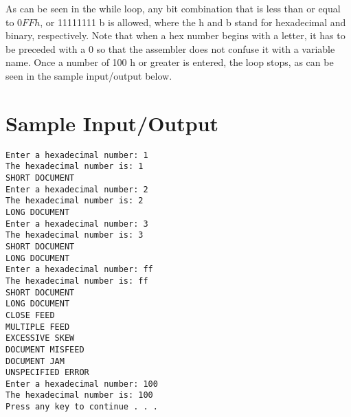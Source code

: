 \documentclass[10pt]{article}
\begin{document}
As can be seen in the while loop, any bit combination that is less than or equal to $0 F F h$, or 11111111 b is allowed, where the h and b stand for hexadecimal and binary, respectively. Note that when a hex number begins with a letter, it has to be preceded with a 0 so that the assembler does not confuse it with a variable name. Once a number of 100 h or greater is entered, the loop stops, as can be seen in the sample input/output below.

\section*{Sample Input/Output}
\begin{verbatim}
Enter a hexadecimal number: 1
The hexadecimal number is: 1
SHORT DOCUMENT
Enter a hexadecimal number: 2
The hexadecimal number is: 2
LONG DOCUMENT
Enter a hexadecimal number: 3
The hexadecimal number is: 3
SHORT DOCUMENT
LONG DOCUMENT
Enter a hexadecimal number: ff
The hexadecimal number is: ff
SHORT DOCUMENT
LONG DOCUMENT
CLOSE FEED
MULTIPLE FEED
EXCESSIVE SKEW
DOCUMENT MISFEED
DOCUMENT JAM
UNSPECIFIED ERROR
Enter a hexadecimal number: 100
The hexadecimal number is: 100
Press any key to continue . . .
\end{verbatim}
\end{document}
